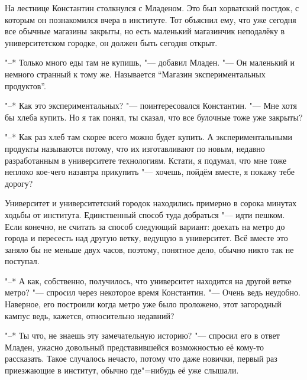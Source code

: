 На лестнице Константин столкнулся с Младеном.
Это был хорватский постдок, с которым он познакомился вчера в институте.
Тот объяснил ему, что уже сегодня все обычные магазины закрыты, но есть
маленький магазинчик неподалёку в университетском городке, он должен быть
сегодня открыт.

"--* Только много еды там не купишь, "--- добавил Младен.
"--- Он маленький и немного странный к тому же.
Называется \enquote{Магазин экспериментальных продуктов}.

"--* Как это экспериментальных? "--- поинтересовался Константин.
"--- Мне хотя бы хлеба купить.
Но я так понял, ты сказал, что все булочные тоже уже закрыты?

"--* Как раз хлеб там скорее всего можно будет купить.
А экспериментальными продукты называются потому, что их изготавливают по новым,
недавно разработанным в университете технологиям.
Кстати, я подумал, что мне тоже неплохо кое-чего назавтра прикупить "--- хочешь,
пойдём вместе, я покажу тебе дорогу?

Университет и университетский городок находились примерно в сорока минутах
ходьбы от института.
Единственный способ туда добраться "--- идти пешком.
Если конечно, не считать за способ следующий вариант: доехать на метро до города
и пересесть над другую ветку, ведущую в университет.
Всё вместе это заняло бы не меньше двух часов, поэтому, понятное дело, обычно
никто так не поступал.

"--* А как, собственно, получилось, что университет находится на другой ветке
метро? "--- спросил через некоторое время Константин.
"--- Очень ведь неудобно.
Наверное, его построили когда метро уже было проложено, этот загородный кампус
ведь, кажется, относительно недавний?

"--* Ты что, не знаешь эту замечательную историю? "--- спросил его в ответ
Младен, ужасно довольный представившейся возможностью её кому-то рассказать.
Такое случалось нечасто, потому что даже новички, первый раз приезжающие в
институт, обычно где"=нибудь её уже слышали.

